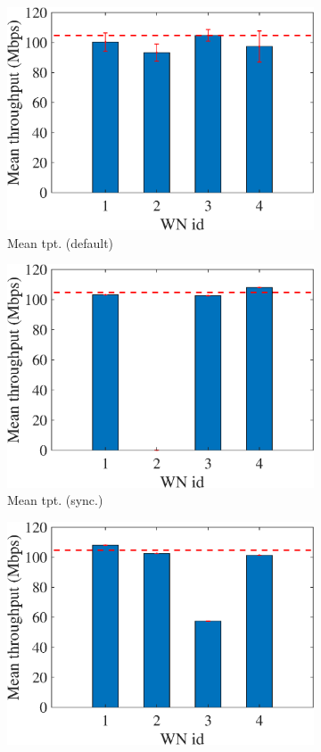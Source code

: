 \documentclass[preprint,12pt]{article}
\begin{document}
\begin{figure}[h!]
\begin{subfigure}[b]{.3\textwidth}
		\includegraphics[width=\textwidth]{images/mean_tpt_EXP3}
		\caption{Mean tpt. (default)}\label{fig:mean_tpt_EXP3}
	\end{subfigure}
	\begin{subfigure}[b]{.3\textwidth}
		\includegraphics[width=\textwidth]{images/mean_tpt_OEXP3}
		\caption{Mean tpt. (sync.)}\label{fig:mean_tpt_OEXP3}
	\end{subfigure}
	\begin{subfigure}[b]{.3\textwidth}
		\includegraphics[width=\textwidth]{images/mean_tpt_CEXP3}

\end{subfigure}
\end{figure}
\end{document}
